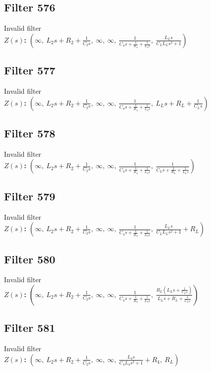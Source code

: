 \documentclass{article}
\begin{document}
\subsection*{Filter 576}
Invalid filter \\ 
\textbf{$Z(s)$:} $\left( \infty, \  L_{2} s + R_{2} + \frac{1}{C_{2} s}, \  \infty, \  \infty, \  \frac{1}{C_{4} s + \frac{1}{R_{4}} + \frac{1}{L_{4} s}}, \  \frac{L_{L} s}{C_{L} L_{L} s^{2} + 1}\right)$ \\ 
\subsection*{Filter 577}
Invalid filter \\ 
\textbf{$Z(s)$:} $\left( \infty, \  L_{2} s + R_{2} + \frac{1}{C_{2} s}, \  \infty, \  \infty, \  \frac{1}{C_{4} s + \frac{1}{R_{4}} + \frac{1}{L_{4} s}}, \  L_{L} s + R_{L} + \frac{1}{C_{L} s}\right)$ \\ 
\subsection*{Filter 578}
Invalid filter \\ 
\textbf{$Z(s)$:} $\left( \infty, \  L_{2} s + R_{2} + \frac{1}{C_{2} s}, \  \infty, \  \infty, \  \frac{1}{C_{4} s + \frac{1}{R_{4}} + \frac{1}{L_{4} s}}, \  \frac{1}{C_{L} s + \frac{1}{R_{L}} + \frac{1}{L_{L} s}}\right)$ \\ 
\subsection*{Filter 579}
Invalid filter \\ 
\textbf{$Z(s)$:} $\left( \infty, \  L_{2} s + R_{2} + \frac{1}{C_{2} s}, \  \infty, \  \infty, \  \frac{1}{C_{4} s + \frac{1}{R_{4}} + \frac{1}{L_{4} s}}, \  \frac{L_{L} s}{C_{L} L_{L} s^{2} + 1} + R_{L}\right)$ \\ 
\subsection*{Filter 580}
Invalid filter \\ 
\textbf{$Z(s)$:} $\left( \infty, \  L_{2} s + R_{2} + \frac{1}{C_{2} s}, \  \infty, \  \infty, \  \frac{1}{C_{4} s + \frac{1}{R_{4}} + \frac{1}{L_{4} s}}, \  \frac{R_{L} \left(L_{L} s + \frac{1}{C_{L} s}\right)}{L_{L} s + R_{L} + \frac{1}{C_{L} s}}\right)$ \\ 
\subsection*{Filter 581}
Invalid filter \\ 
\textbf{$Z(s)$:} $\left( \infty, \  L_{2} s + R_{2} + \frac{1}{C_{2} s}, \  \infty, \  \infty, \  \frac{L_{4} s}{C_{4} L_{4} s^{2} + 1} + R_{4}, \  R_{L}\right)$ \\ 
\end{document}
